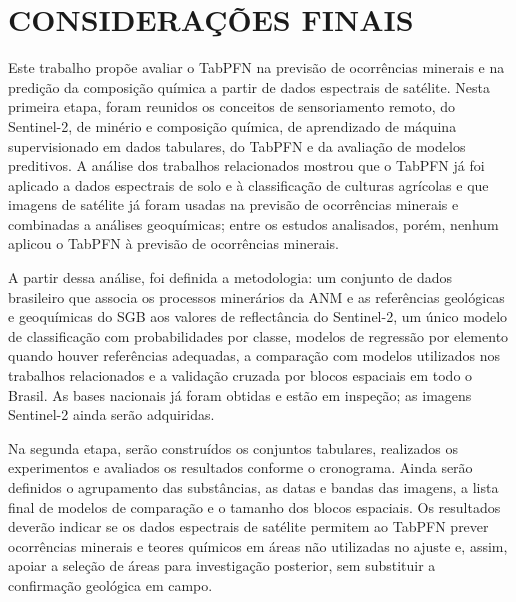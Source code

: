 \chapter{CONSIDERAÇÕES FINAIS}
\label{chap:consideracoes-finais}

Este trabalho propõe avaliar o TabPFN na previsão de ocorrências minerais e na predição da composição química a partir de dados espectrais de satélite. Nesta primeira etapa, foram reunidos os conceitos de sensoriamento remoto, do Sentinel-2, de minério e composição química, de aprendizado de máquina supervisionado em dados tabulares, do TabPFN e da avaliação de modelos preditivos. A análise dos trabalhos relacionados mostrou que o TabPFN já foi aplicado a dados espectrais de solo e à classificação de culturas agrícolas e que imagens de satélite já foram usadas na previsão de ocorrências minerais e combinadas a análises geoquímicas; entre os estudos analisados, porém, nenhum aplicou o TabPFN à previsão de ocorrências minerais.

A partir dessa análise, foi definida a metodologia: um conjunto de dados brasileiro que associa os processos minerários da ANM e as referências geológicas e geoquímicas do SGB aos valores de reflectância do Sentinel-2, um único modelo de classificação com probabilidades por classe, modelos de regressão por elemento quando houver referências adequadas, a comparação com modelos utilizados nos trabalhos relacionados e a validação cruzada por blocos espaciais em todo o Brasil. As bases nacionais já foram obtidas e estão em inspeção; as imagens Sentinel-2 ainda serão adquiridas.

Na segunda etapa, serão construídos os conjuntos tabulares, realizados os experimentos e avaliados os resultados conforme o cronograma. Ainda serão definidos o agrupamento das substâncias, as datas e bandas das imagens, a lista final de modelos de comparação e o tamanho dos blocos espaciais. Os resultados deverão indicar se os dados espectrais de satélite permitem ao TabPFN prever ocorrências minerais e teores químicos em áreas não utilizadas no ajuste e, assim, apoiar a seleção de áreas para investigação posterior, sem substituir a confirmação geológica em campo.
